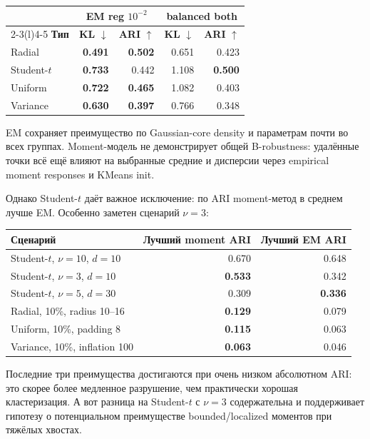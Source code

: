 \documentclass[11pt,a4paper]{article}
\newcommand{\best}[1]{\textbf{\color{green}#1}}
\begin{document}
\begin{center}
\small
\begin{tabular}{@{}l rr rr@{}}
\toprule
\rowcolor{lightgray}
& \multicolumn{2}{c}{\textbf{EM reg $10^{-2}$}} &
\multicolumn{2}{c}{\textbf{balanced both}}\\
\cmidrule(lr){2-3}\cmidrule(l){4-5}
\textbf{Тип} & \textbf{KL} $\downarrow$ & \textbf{ARI} $\uparrow$ &
\textbf{KL} $\downarrow$ & \textbf{ARI} $\uparrow$\\
\midrule
Radial       & \best{0.491} & \best{0.502} & 0.651 & 0.423\\
Student-$t$  & \best{0.733} & 0.442 & 1.108 & \best{0.500}\\
Uniform      & \best{0.722} & \best{0.465} & 1.082 & 0.403\\
Variance     & \best{0.630} & \best{0.397} & 0.766 & 0.348\\
\bottomrule
\end{tabular}
\end{center}

EM сохраняет преимущество по Gaussian-core density и параметрам почти во
всех группах. Moment-модель не демонстрирует общей B-robustness: удалённые
точки всё ещё влияют на выбранные средние и дисперсии через empirical moment
responses и KMeans init.

Однако Student-$t$ даёт важное исключение: по ARI moment-метод в среднем
лучше EM. Особенно заметен сценарий $\nu=3$:

\begin{center}
\small
\begin{tabular}{@{}lrr@{}}
\toprule
\rowcolor{lightgray}
\textbf{Сценарий} & \textbf{Лучший moment ARI} & \textbf{Лучший EM ARI}\\
\midrule
Student-$t$, $\nu=10$, $d=10$ & 0.670 & 0.648\\
Student-$t$, $\nu=3$, $d=10$ & \best{0.533} & 0.342\\
Student-$t$, $\nu=5$, $d=30$ & 0.309 & \best{0.336}\\
Radial, 10\%, radius 10--16 & \best{0.129} & 0.079\\
Uniform, 10\%, padding 8 & \best{0.115} & 0.063\\
Variance, 10\%, inflation 100 & \best{0.063} & 0.046\\
\bottomrule
\end{tabular}
\end{center}

Последние три преимущества достигаются при очень низком абсолютном ARI:
это скорее более медленное разрушение, чем практически хорошая
кластеризация. А вот разница на Student-$t$ с $\nu=3$ содержательна и
поддерживает гипотезу о потенциальном преимуществе bounded/localized
моментов при тяжёлых хвостах.
\end{document}
